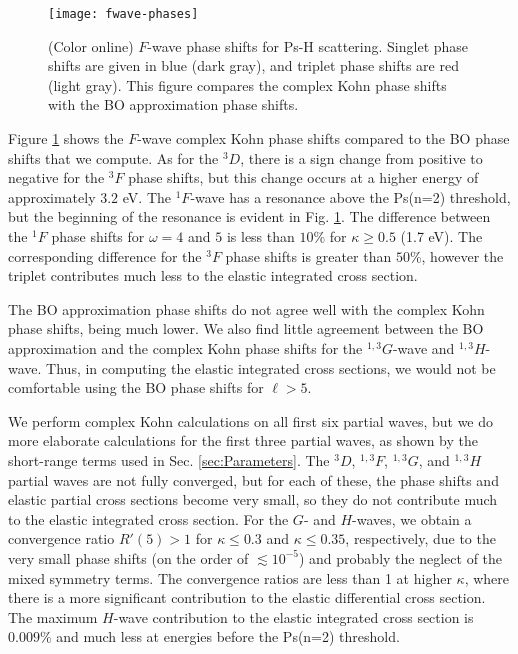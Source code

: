 \documentclass[preprint,showpacs,showkeys,preprintnumbers,amsmath,amssymb,longbibliography,pra,aps]{revtex4-1}
\begin{document}
{\begin{figure}[H]
	\centering
	\texttt{[image: fwave-phases]}
	\caption{(Color online) $F$-wave phase shifts for Ps-H scattering.
Singlet phase shifts are given in blue
(dark gray), and triplet phase shifts are red (light gray). This figure
compares the complex Kohn phase shifts with the BO approximation phase shifts.}
	\label{fig:fwave-phases}
\end{figure}

Figure \ref{fig:fwave-phases} shows the $F$-wave complex Kohn phase shifts 
compared to the BO phase shifts that we compute. As for the $^3D$, there
is a sign change 
from positive to negative for the $^3F$ phase shifts, but this change 
occurs at a higher energy of approximately $3.2$ eV. The $^1F$-wave has a 
resonance above the Ps(n=2) threshold, but the beginning of the resonance is 
evident in Fig. \ref{fig:fwave-phases}. The difference between the $^1F$ phase
shifts for $\omega = 4$ and $5$ is less than $10\%$ for $\kappa \geq 0.5$
(1.7 eV). The corresponding difference for the $^3F$ phase shifts is greater
than $50\%$, however the triplet contributes much less to the 
elastic integrated cross section.

The BO approximation phase shifts do
not agree well with the complex Kohn phase shifts, being much lower. We 
also find little agreement between the BO approximation and the complex 
Kohn phase shifts for the $^{1,3}G$-wave and $^{1,3}H$-wave. Thus, in 
computing the elastic integrated cross sections, we would not be comfortable 
using the BO phase shifts for $\ell > 5$.

We perform complex Kohn calculations on all first six partial waves, but 
we do more elaborate calculations for the first three partial waves, as shown 
by the short-range terms used in Sec. \ref{sec:Parameters}.
The $^3D$, $^{1,3}F$, $^{1,3}G$, and $^{1,3}H$ partial waves are not fully
converged, but for each of these, the phase shifts and elastic partial cross 
sections become very small, so they do not contribute much to the elastic
integrated cross section.
For the $G$- and $H$-waves, we obtain a convergence ratio $R'(5) > 1$ for
$\kappa \leq 0.3$ and $\kappa \leq 0.35$, respectively, due to the very small
phase shifts (on the order of $\lesssim 10^{-5}$) and probably the neglect of
the mixed symmetry terms. The convergence ratios
are less than 1 at higher $\kappa$, where there is a more significant
contribution to the elastic differential cross section.
The maximum $H$-wave contribution to the elastic integrated cross
section is $0.009\%$ and much less at energies before the Ps(n=2)
threshold.

}
\end{document}
